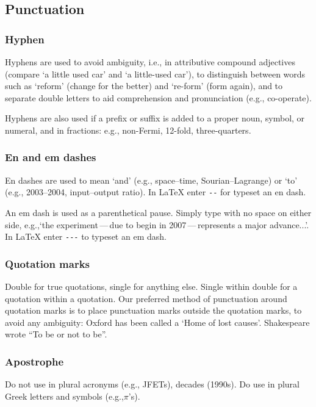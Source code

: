 \documentclass{cernphprep}
\providecommand*\eg{e.g.,\xspace}
\providecommand*\ie{i.e.,\xspace}
\begin{document}
\subsection{Punctuation}

\subsubsection{Hyphen}

Hyphens are used to avoid ambiguity, \ie in attributive compound
adjectives (compare `a little used car' and `a little-used car'), to
distinguish between words such as `reform' (change for the better) and
`re-form' (form again), and to separate double letters to aid
comprehension and pronunciation (\eg co-operate).

Hyphens are also used if a prefix or suffix is added to a proper noun,
symbol, or numeral, and in fractions: \eg non-Fermi, 12-fold,
three-quarters.

\subsubsection{En and em dashes}

En dashes are used to mean `and' (\eg space--time, Sourian--Lagrange)
or `to' (\eg 2003--2004, input--output ratio). In \LaTeX{} enter
\texttt{{-}{-}} for typeset an en dash.

An em dash is used as a parenthetical pause. Simply type with no space
on either side, \eg `the experiment\,---\,due to begin in
2007\,---\,represents a major advance...'. In \LaTeX{} enter
\texttt{{-}{-}{-}} to typeset an em dash.

\subsubsection{Quotation marks}

Double for true quotations, single for anything else. Single within
double for a quotation within a quotation. Our preferred method of
punctuation around quotation marks is to place punctuation marks
outside the quotation marks, to avoid any ambiguity: Oxford has been
called a `Home of lost causes'. Shakespeare wrote ``To be or not to be''.


\subsubsection{Apostrophe}

Do not use in plural acronyms (\eg JFETs), decades (1990s).  Do use
in plural Greek letters and symbols (\eg $\pi$'s).
\end{document}

